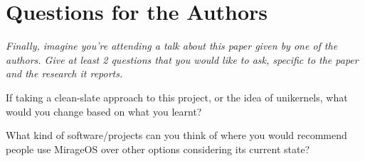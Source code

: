 \documentclass[11pt]{article}
\begin{document}
\section*{Questions for the Authors}

\textsl{Finally, imagine you're attending a talk about this paper given by one
of the authors. Give at least 2 questions that you would like to ask, specific
to the paper and the research it reports.}

If taking a clean-slate approach to this project, or the idea of unikernels,
what would you change based on what you learnt?

What kind of software/projects can you think of where you would recommend
people use MirageOS over other options considering its current state?




\end{document}

